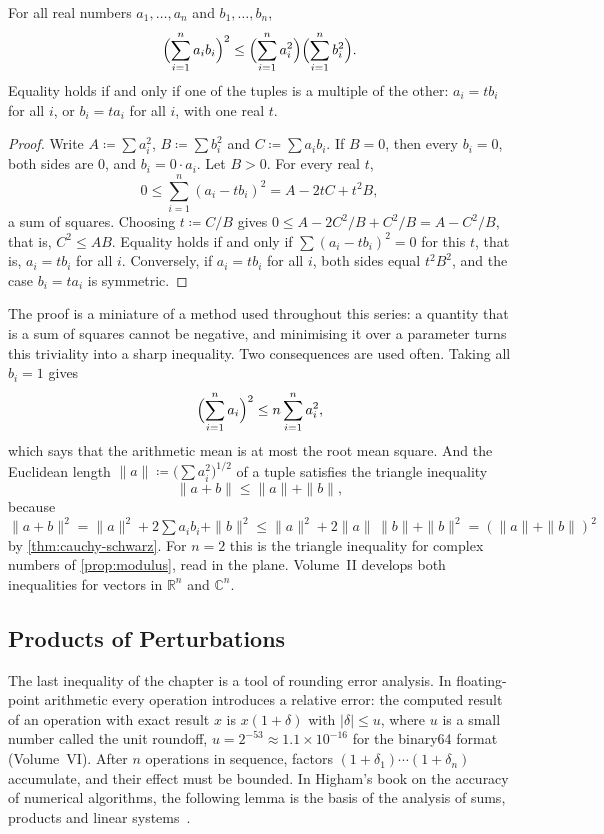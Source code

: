 \begin{theorem}
\label{thm:cauchy-schwarz}
For all real numbers $a_1,\ldots,a_n$ and $b_1,\ldots,b_n$,
\[
\Bigl(\sum_{i=1}^na_ib_i\Bigr)^2\le\Bigl(\sum_{i=1}^na_i^2\Bigr)\Bigl(\sum_{i=1}^nb_i^2\Bigr).
\]
Equality holds if and only if one of the tuples is a multiple of the other: $a_i=tb_i$ for all $i$, or $b_i=ta_i$ for all $i$, with one real $t$.
\end{theorem}

\begin{proof}
Write $A\coloneqq\sum a_i^2$, $B\coloneqq\sum b_i^2$ and $C\coloneqq\sum a_ib_i$. If $B=0$, then every $b_i=0$, both sides are $0$, and $b_i=0\cdot a_i$. Let $B>0$. For every real $t$,
\[
0\le\sum_{i=1}^n(a_i-tb_i)^2=A-2tC+t^2B ,
\]
a sum of squares. Choosing $t\coloneqq C/B$ gives $0\le A-2C^2/B+C^2/B=A-C^2/B$, that is, $C^2\le AB$. Equality holds if and only if $\sum(a_i-tb_i)^2=0$ for this $t$, that is, $a_i=tb_i$ for all $i$. Conversely, if $a_i=tb_i$ for all $i$, both sides equal $t^2B^2$, and the case $b_i=ta_i$ is symmetric.
\end{proof}

The proof is a miniature of a method used throughout this series: a quantity that is a sum of squares cannot be negative, and minimising it over a parameter turns this triviality into a sharp inequality. Two consequences are used often. Taking all $b_i=1$ gives
\[
\Bigl(\sum_{i=1}^na_i\Bigr)^2\le n\sum_{i=1}^na_i^2 ,
\]
which says that the arithmetic mean is at most the root mean square. And the Euclidean length $\|a\|\coloneqq\bigl(\sum a_i^2\bigr)^{1/2}$ of a tuple satisfies the triangle inequality
\begin{equation}
\|a+b\|\le\|a\|+\|b\| ,
\label{eq:minkowski}
\end{equation}
because $\|a+b\|^2=\|a\|^2+2\sum a_ib_i+\|b\|^2\le\|a\|^2+2\|a\|\,\|b\|+\|b\|^2=(\|a\|+\|b\|)^2$ by \cref{thm:cauchy-schwarz}. For $n=2$ this is the triangle inequality for complex numbers of \cref{prop:modulus}, read in the plane. Volume~II develops both inequalities for vectors in $\mathbb R^n$ and $\mathbb C^n$.

\subsection{Products of Perturbations}

The last inequality of the chapter is a tool of rounding error analysis. In floating-point arithmetic every operation introduces a relative error: the computed result of an operation with exact result $x$ is $x(1+\delta)$ with $|\delta|\le u$, where $u$ is a small number called the unit roundoff, $u=2^{-53}\approx1.1\times10^{-16}$ for the binary64 format (Volume~VI). After $n$ operations in sequence, factors $(1+\delta_1)\cdots(1+\delta_n)$ accumulate, and their effect must be bounded. In Higham's book on the accuracy of numerical algorithms, the following lemma is the basis of the analysis of sums, products and linear systems~\cite{higham2002accuracy}.

